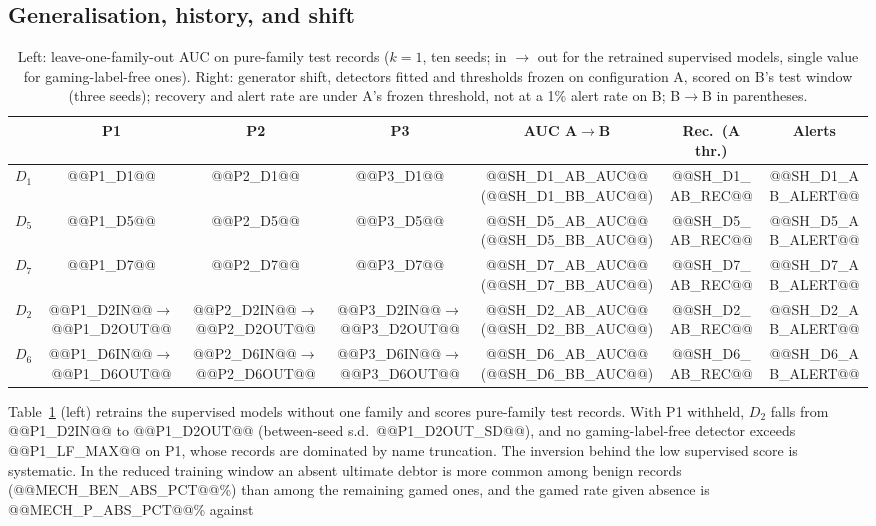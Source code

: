 \documentclass[conference]{IEEEtran}
\begin{document}
\subsection{Generalisation, history, and shift}
\begin{table}[!t]
\caption{Left: leave-one-family-out AUC on pure-family test records ($k=1$,
ten seeds; in $\rightarrow$ out for the retrained supervised models,
single value for gaming-label-free ones). Right: generator shift, detectors fitted
and thresholds frozen on configuration A, scored on B's test window (three
seeds); recovery and alert rate are under A's frozen threshold, not at a 1\%
alert rate on B; B$\rightarrow$B in parentheses.}
\label{tab:loo}
\centering
\scriptsize
\setlength{\tabcolsep}{2pt}
\begin{tabular}{@{}lccc|ccc@{}}
\toprule
 & P1 & P2 & P3 & AUC A$\rightarrow$B & Rec.\ (A thr.) & Alerts \\
\midrule
$D_1$ & @@P1_D1@@ & @@P2_D1@@ & @@P3_D1@@ & @@SH_D1_AB_AUC@@ (@@SH_D1_BB_AUC@@) & @@SH_D1_AB_REC@@ & @@SH_D1_AB_ALERT@@ \\
$D_5$ & @@P1_D5@@ & @@P2_D5@@ & @@P3_D5@@ & @@SH_D5_AB_AUC@@ (@@SH_D5_BB_AUC@@) & @@SH_D5_AB_REC@@ & @@SH_D5_AB_ALERT@@ \\
$D_7$ & @@P1_D7@@ & @@P2_D7@@ & @@P3_D7@@ & @@SH_D7_AB_AUC@@ (@@SH_D7_BB_AUC@@) & @@SH_D7_AB_REC@@ & @@SH_D7_AB_ALERT@@ \\
$D_2$ & @@P1_D2IN@@$\rightarrow$@@P1_D2OUT@@ & @@P2_D2IN@@$\rightarrow$@@P2_D2OUT@@ & @@P3_D2IN@@$\rightarrow$@@P3_D2OUT@@ & @@SH_D2_AB_AUC@@ (@@SH_D2_BB_AUC@@) & @@SH_D2_AB_REC@@ & @@SH_D2_AB_ALERT@@ \\
$D_6$ & @@P1_D6IN@@$\rightarrow$@@P1_D6OUT@@ & @@P2_D6IN@@$\rightarrow$@@P2_D6OUT@@ & @@P3_D6IN@@$\rightarrow$@@P3_D6OUT@@ & @@SH_D6_AB_AUC@@ (@@SH_D6_BB_AUC@@) & @@SH_D6_AB_REC@@ & @@SH_D6_AB_ALERT@@ \\
\bottomrule
\end{tabular}
\end{table}
Table~\ref{tab:loo} (left) retrains the supervised models without one
family and scores pure-family test records. With P1 withheld, $D_2$ falls from
@@P1_D2IN@@ to @@P1_D2OUT@@ (between-seed s.d.\ @@P1_D2OUT_SD@@), and no
gaming-label-free detector exceeds @@P1_LF_MAX@@ on P1, whose records are dominated
by name truncation. The inversion behind the low supervised score is
systematic. In the reduced training window an absent ultimate debtor is more
common among benign records (@@MECH_BEN_ABS_PCT@@\%) than among the remaining
gamed ones, and the gamed rate given absence is @@MECH_P_ABS_PCT@@\% against
\end{document}
